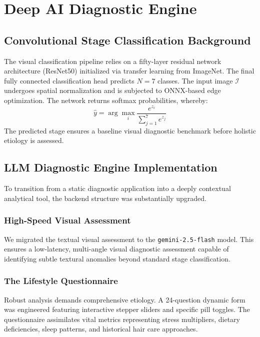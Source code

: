 \documentclass[12pt, a4paper]{article}
\begin{document}
\section{Deep AI Diagnostic Engine}

\subsection{Convolutional Stage Classification Background}
The visual classification pipeline relies on a fifty-layer residual network architecture (ResNet50) initialized via transfer learning from ImageNet. The final fully connected classification head predicts $N=7$ classes. The input image $\mathcal{I}$ undergoes spatial normalization and is subjected to ONNX-based edge optimization. The network returns softmax probabilities, whereby:
\begin{equation}
\hat{y} = \arg\max_{i} \frac{e^{z_i}}{\sum_{j=1}^{7} e^{z_j}}
\end{equation}
The predicted stage ensures a baseline visual diagnostic benchmark before holistic etiology is assessed.

\subsection{LLM Diagnostic Engine Implementation}
To transition from a static diagnostic application into a deeply contextual analytical tool, the backend structure was substantially upgraded.

\subsubsection{High-Speed Visual Assessment}
We migrated the textual visual assessment to the \texttt{gemini-2.5-flash} model. This ensures a low-latency, multi-angle visual diagnostic assessment capable of identifying subtle textural anomalies beyond standard stage classification.

\subsubsection{The Lifestyle Questionnaire}
Robust analysis demands comprehensive etiology. A 24-question dynamic form was engineered featuring interactive stepper sliders and specific pill toggles. The questionnaire assimilates vital metrics representing stress multipliers, dietary deficiencies, sleep patterns, and historical hair care approaches.
\end{document}
